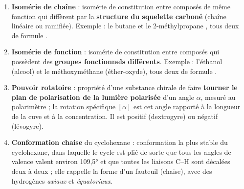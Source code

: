 \documentclass[11pt]{article}
\begin{document}
\begin{corrige}
\begin{enumerate}
\item \textbf{Isomérie de chaîne} : isomérie de constitution entre composés de même fonction qui diffèrent par la \textbf{structure du squelette carboné} (chaîne linéaire ou ramifiée). Exemple : le butane  et le 2-méthylpropane , tous deux de formule .
\item \textbf{Isomérie de fonction} : isomérie de constitution entre composés qui possèdent des \textbf{groupes fonctionnels différents}. Exemple : l'éthanol  (alcool) et le méthoxyméthane  (éther-oxyde), tous deux de formule .
\item \textbf{Pouvoir rotatoire} : propriété d'une substance chirale de faire \textbf{tourner le plan de polarisation de la lumière polarisée} d'un angle $\alpha$, mesuré au polarimètre ; la rotation spécifique $[\alpha]$ est cet angle rapporté à la longueur de la cuve et à la concentration. Il est positif (dextrogyre) ou négatif (lévogyre).
\item \textbf{Conformation chaise} du cyclohexane : conformation la plus stable du cyclohexane, dans laquelle le cycle est plié de sorte que tous les angles de valence valent environ \ang{109,5} et que toutes les liaisons C--H sont décalées deux à deux ; elle rappelle la forme d'un fauteuil (chaise), avec des hydrogènes \emph{axiaux} et \emph{équatoriaux}.
\end{enumerate}
\end{corrige}
\end{document}
